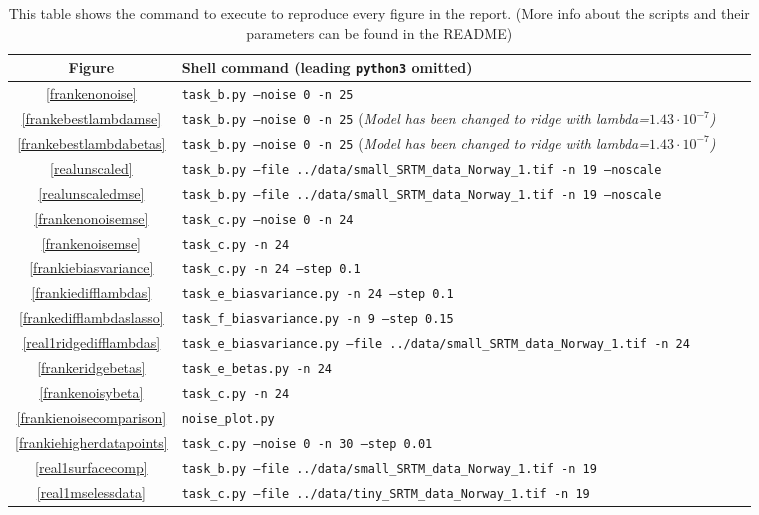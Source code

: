 \documentclass[onecolumn,10pt,cleanfoot]{asme2ej}
\begin{document}
\begin{table*}
\caption{This table shows the command to execute to reproduce every figure in the report. (More info about the scripts and their parameters can be found in the README)}
\begin{center}
\label{allparamstable}
\begin{tabular}{c | l l l}
Figure & Shell command (leading \texttt{python3} omitted) \\
\hline
\ref{frankenonoise} & \texttt{task\_b.py --noise 0 -n 25}\\
\ref{frankebestlambdamse} & \texttt{task\_b.py --noise 0 -n 25} \footnotesize{(\it Model has been changed to ridge with lambda=$1.43 \cdot 10^{-7}$)}\\
\ref{frankebestlambdabetas} & \texttt{task\_b.py --noise 0 -n 25} \footnotesize{(\it Model has been changed to ridge with lambda=$1.43 \cdot 10^{-7}$)}\\
\ref{realunscaled} & \texttt{task\_b.py --file ../data/small\_SRTM\_data\_Norway\_1.tif -n 19 --noscale}\\
\ref{realunscaledmse} & \texttt{task\_b.py --file ../data/small\_SRTM\_data\_Norway\_1.tif -n 19 --noscale}\\
\ref{frankenonoisemse} & \texttt{task\_c.py --noise 0 -n 24}\\
\ref{frankenoisemse} & \texttt{task\_c.py -n 24}\\
\ref{frankiebiasvariance} & \texttt{task\_c.py -n 24 --step 0.1}\\
\ref{frankiedifflambdas} & \texttt{task\_e\_biasvariance.py -n 24 --step 0.1}\\
\ref{frankedifflambdaslasso} & \texttt{task\_f\_biasvariance.py -n 9 --step 0.15}\\
\ref{real1ridgedifflambdas} & \texttt{task\_e\_biasvariance.py --file ../data/small\_SRTM\_data\_Norway\_1.tif -n 24}\\
\ref{frankeridgebetas} & \texttt{task\_e\_betas.py -n 24}\\
\ref{frankenoisybeta} & \texttt{task\_c.py -n 24}\\
\ref{frankienoisecomparison} & \texttt{noise\_plot.py}\\
\ref{frankiehigherdatapoints} & \texttt{task\_c.py --noise 0 -n 30 --step 0.01}\\
\ref{real1surfacecomp} & \texttt{task\_b.py --file ../data/small\_SRTM\_data\_Norway\_1.tif -n 19}\\
\ref{real1mselessdata} & \texttt{task\_c.py --file ../data/tiny\_SRTM\_data\_Norway\_1.tif -n 19}\\

\end{tabular}
\end{center}
\end{table*}
\end{document}
